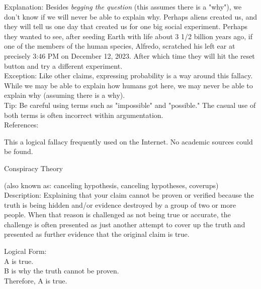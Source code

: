 \documentclass[a4paper,12pt,single,pdftex]{scrartcl}
\begin{document}
    
      Explanation: Besides {\it begging the question} (this assumes there is a "why"), we don't know if we will never be able to explain why. Perhaps aliens created us, and they will tell us one day that created us for one big social experiment. Perhaps they wanted to see, after seeding Earth with life about 3 1/2 billion years ago, if one of the members of the human species, Alfredo, scratched his left ear at precisely 3:46 PM on December 12, 2023. After which time they will hit the reset button and try a different experiment.
    \\

    
      Exception: Like other claims, expressing probability is a way around this fallacy.
    \\

    
      While we may be able to explain how humans got here, we may  never be able to explain why (assuming there is a why).
    \\

    
      Tip: Be careful using terms such as "impossible" and "possible." The casual use of both terms is often incorrect within argumentation.
    \\

    References:

    
      This a logical fallacy frequently used on the Internet. No academic sources could be found.
    
  

Conspiracy Theory
    
      (also known as: canceling hypothesis, canceling hypotheses, coverups)
    \\

  
    Description: Explaining that your claim cannot be proven or verified because the truth is being hidden and/or evidence destroyed by a group of two or more people.  When that reason is challenged as not being true or accurate, the challenge is often presented as just another attempt to cover up the truth and presented as further evidence that the original claim is true.

    
      Logical Form:
    \\

    
      A is true.
    \\

    
      B is why the truth cannot be proven.
    \\

    
      Therefore, A is true.
    \\
\end{document}
